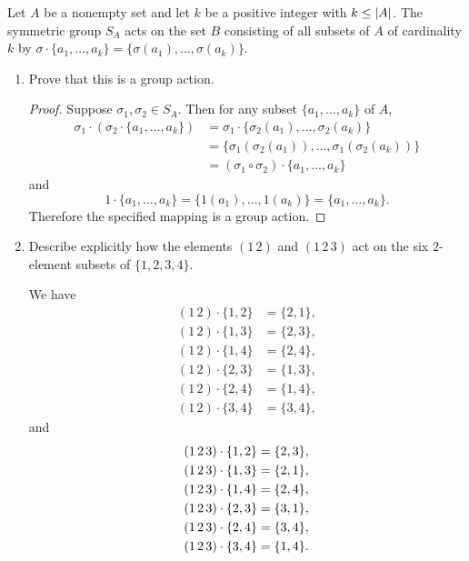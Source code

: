  Let $A$ be a nonempty set and let $k$ be a positive integer
with $k\leq\lvert{A}\rvert$. The symmetric group $S_A$ acts on the set $B$
consisting of all subsets of $A$ of cardinality $k$ by
$\sigma\cdot\{a_1,\dots,a_k\} = \{\sigma(a_1),\dots,\sigma(a_k)\}$.
\begin{enumerate}
\item Prove that this is a group action.
  \begin{proof}
    Suppose $\sigma_1,\sigma_2\in S_A$. Then for any subset
    $\{a_1,\dots,a_k\}$ of $A$,
    \begin{align*}
      \sigma_1\cdot(\sigma_2\cdot\{a_1,\dots,a_k\})
      &= \sigma_1\cdot\{\sigma_2(a_1),\dots,\sigma_2(a_k)\} \\
      &= \{\sigma_1(\sigma_2(a_1)),\dots,\sigma_1(\sigma_2(a_k))\} \\
      &= (\sigma_1\circ\sigma_2)\cdot\{a_1,\dots,a_k\}
    \end{align*}
    and
    \begin{equation*}
      1\cdot\{a_1,\dots,a_k\}
      = \{1(a_1),\dots, 1(a_k)\}
      = \{a_1,\dots,a_k\}.
    \end{equation*}
    Therefore the specified mapping is a group action.
  \end{proof}
\item Describe explicitly how the elements $(1\,2)$ and $(1\,2\,3)$
  act on the six $2$-element subsets of $\{1,2,3,4\}$.
  \begin{solution}
    We have
    \begin{align*}
      (1\,2)\cdot\{1,2\} &= \{2,1\}, \\
      (1\,2)\cdot\{1,3\} &= \{2,3\}, \\
      (1\,2)\cdot\{1,4\} &= \{2,4\}, \\
      (1\,2)\cdot\{2,3\} &= \{1,3\}, \\
      (1\,2)\cdot\{2,4\} &= \{1,4\}, \\
      (1\,2)\cdot\{3,4\} &= \{3,4\},
    \end{align*}
    and
    \begin{align*}
      (1\,2\,3)\cdot\{1,2\} &= \{2,3\}, \\
      (1\,2\,3)\cdot\{1,3\} &= \{2,1\}, \\
      (1\,2\,3)\cdot\{1,4\} &= \{2,4\}, \\
      (1\,2\,3)\cdot\{2,3\} &= \{3,1\}, \\
      (1\,2\,3)\cdot\{2,4\} &= \{3,4\}, \\
      (1\,2\,3)\cdot\{3,4\} &= \{1,4\}. \qedhere
    \end{align*}
  \end{solution}
\end{enumerate}

